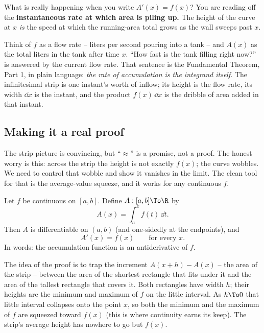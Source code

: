 \begin{happeningbox}
What is really happening when you write $A'(x)=f(x)$? You are reading off the
\textbf{instantaneous rate at which area is piling up.} The height of the curve
at $x$ \emph{is} the speed at which the running-area total grows as the wall
sweeps past $x$.

Think of $f$ as a flow rate -- liters per second pouring into a tank -- and
$A(x)$ as the total liters in the tank after time $x$. ``How fast is the tank
filling right now?'' is answered by the current flow rate. That sentence is the
Fundamental Theorem, Part 1, in plain language: \emph{the rate of accumulation is
the integrand itself}. The infinitesimal strip is one instant's worth of inflow;
its height is the flow rate, its width $\dd x$ is the instant, and the product
$f(x)\,\dd x$ is the dribble of area added in that instant.
\end{happeningbox}

\subsection{Making it a real proof}

The strip picture is convincing, but ``$\approx$'' is a promise, not a proof. The
honest worry is this: across the strip the height is not exactly $f(x)$; the
curve wobbles. We need to control that wobble and show it vanishes in the limit.
The clean tool for that is the average-value squeeze, and it works for any
continuous $f$.

\begin{theorem}\label{ch21:thm-ftc1}
Let $f$ be continuous on $[a,b]$. Define $A:[a,b]\To\R$ by
\[
  A(x) = \int_a^x f(t)\,\dd t .
\]
Then $A$ is differentiable on $(a,b)$ (and one-sidedly at the endpoints), and
\[
  A'(x) = f(x) \qquad\text{for every } x .
\]
In words: the accumulation function is an antiderivative of $f$.
\end{theorem}

\begin{intuitionbox}
The idea of the proof is to trap the increment $A(x+h)-A(x)$ -- the area of the
strip -- between the area of the shortest rectangle that fits under it and the
area of the tallest rectangle that covers it. Both rectangles have width $h$;
their heights are the minimum and maximum of $f$ on the little interval. As
$h\To 0$ that little interval collapses onto the point $x$, so both the minimum
and the maximum of $f$ are squeezed toward $f(x)$ (this is where continuity earns
its keep). The strip's average height has nowhere to go but $f(x)$.
\end{intuitionbox}

